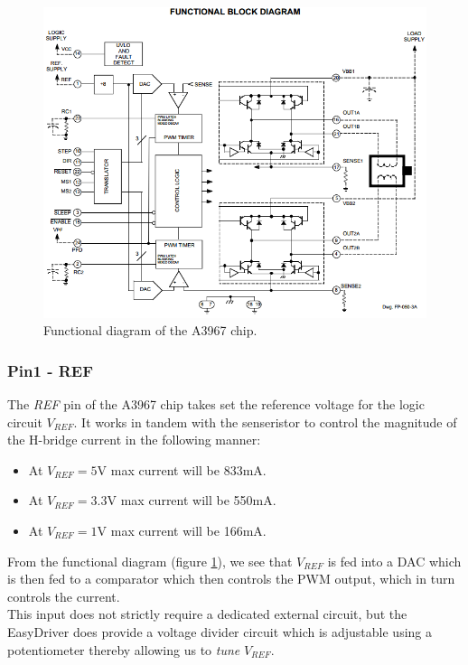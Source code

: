 \documentclass{article}
\theoremstyle{plain}
\theoremstyle{definition}
\theoremstyle{remark}
\begin{document}
\begin{figure}[htb]
\begin{center}
\includegraphics[width = 14cm]{A3967_functionalDiagram.png}
\caption{Functional diagram of the A3967 chip.}
\label{q1_b2}
\end{center}
\end{figure}

\subsubsection*{Pin1 - REF}
The \emph{REF} pin of the A3967 chip takes set the reference voltage for the logic circuit $V_{REF}$. It works in tandem with the senseristor to control the magnitude of the H-bridge current in the following manner:
\begin{itemize}
\item At $V_{REF} = 5$V max current will be 833mA.
\item At $V_{REF} = 3.3$V max current will be 550mA.
\item At $V_{REF} = 1$V max current will be 166mA.
\end{itemize}

From the functional diagram (figure \ref{q1_b2}), we see that $V_{REF}$ is fed into a DAC which is then fed to a comparator which then controls the PWM output, which in turn controls the current.\\

This input does not strictly require a dedicated external circuit, but the EasyDriver does provide a voltage divider circuit which is adjustable using a potentiometer thereby allowing us to \emph{tune} $V_{REF}$. 
\end{document}
